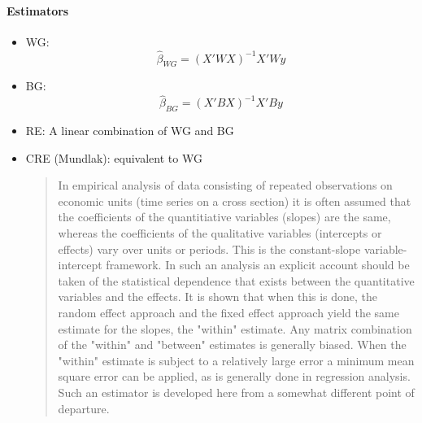 \paragraph{Estimators}
\begin{itemize}
    \item WG: \begin{equation*}
              \hat{\beta}_{WG}=(X'WX)^{-1}X'W y
          \end{equation*}
    \item BG: \begin{equation*}
              \hat{\beta}_{BG}=(X'B X)^{-1}X'By\end{equation*}
    \item RE: A linear combination of WG and BG
    \item CRE (Mundlak): equivalent to WG
          \begin{quote}
              In empirical analysis of data consisting of repeated observations on economic units (time series on a cross section) it is often assumed that the coefficients of the quantitiative variables (slopes) are the same, whereas the coefficients of the qualitative variables (intercepts or effects) vary over units or periods. This is the constant-slope variable- intercept framework. In such an analysis an explicit account should be taken of the statistical dependence that exists between the quantitative variables and the effects. It is shown that when this is done, the random effect approach and the fixed effect approach yield the same estimate for the slopes, the "within" estimate. Any matrix combination of the "within" and "between" estimates is generally biased. When the "within" estimate is subject to a relatively large error a minimum mean square error can be applied, as is generally done in regression analysis. Such an estimator is developed here from a somewhat different point of departure.
          \end{quote}
\end{itemize}
